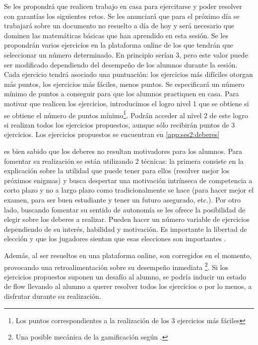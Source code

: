 Se les propondrá que realicen trabajo en casa para ejercitarse y poder resolver con garantías los siguientes retos.
%
Se les anunciará que para el próximo día se trabajará sobre un documento no resuelto a día de hoy y será necesario que dominen las matemáticas básicas que han aprendido en esta sesión.
%
Se les propondrán varios ejercicios en la plataforma online de los que tendrán que seleccionar un número determinado. 
%
En principio serían 3, pero este valor puede ser modificado dependiendo del desempeño de los alumnos durante la sesión.
%
Cada ejercicio tendrá asociado una puntuación: los ejercicios más difíciles otorgan más puntos, los ejercicios más fáciles, menos puntos.
%
Se especificará un número mínimo de puntos a conseguir para que los alumnos practiquen en casa. 
%
Para motivar que realicen los ejercicios, introducimos el logro  nivel 1 que se obtiene si se obtiene el número de puntos mínimo\footnote{Los puntos correspondientes a la realización de los 3 ejercicios más fáciles}.
%
Podrán acceder al nivel 2 de este logro si realizan todos los ejercicios propuestos, aunque sólo recibirán puntos de 3 ejercicios.
%
Los ejercicios propuestos se encuentran en \ref{app:ses2:deberes}

	es bien sabido que los deberes no resultan motivadores para los alumnos. 
	Para fomentar su realización se están utilizando 2 técnicas: 
	la primera consiste en la explicación sobre la utilidad que puede tener para ellos (resolver mejor los próximos enigmas) y busca despertar una motivación intrínseca de competencia a corto plazo y no a largo plazo como tradicionalmente se hace (para hacer mejor el examen, para ser buen estudiante y tener un futuro asegurado, etc.).
	Por otro lado, buscando fomentar su sentido de autonomía se les ofrece la posibilidad de elegir sobre los deberes a realizar. 
	Pueden hacer un número variable de ejercicios dependiendo de su interés, habilidad y motivación.
	Es importante la libertad de elección y que los jugadores sientan que esas elecciones son importantes \citep{werbach2012win}.

	Además, al ser resueltos en una plataforma online, son corregidos en el momento, provocando una retroalimentación sobre su desempeño inmediata
	\footnote{Una posible mecánica de la gamificación según \citeauthor{werbach2012win}.}.
	Si los ejercicios propuestos suponen un desafío al alumno, se podría inducir un estado de flow llevando al alumno a querer resolver todos los ejercicios o por lo menos, a disfrutar durante su realización.



